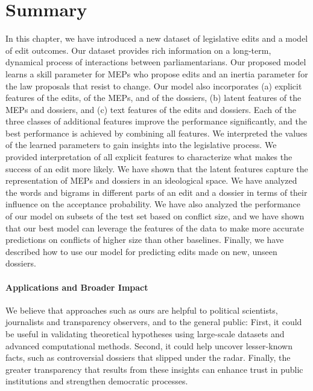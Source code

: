 \section{Summary}
\label{lmp:sec:conclusion}

In this chapter, we have introduced a new dataset of legislative edits and a model of edit outcomes.
Our dataset provides rich information on a long-term, dynamical process of interactions between parliamentarians.
Our proposed model learns a skill parameter for MEPs who propose edits and an inertia parameter for the law proposals that resist to change.
Our model also incorporates (a) explicit features of the edits, of the MEPs, and of the dossiers, (b) latent features of the MEPs and dossiers, and (c) text features of the edits and dossiers.
Each of the three classes of additional features improve the performance significantly, and the best performance is achieved by combining all features.
We interpreted the values of the learned parameters to gain insights into the legislative process.
We provided interpretation of all explicit features to characterize what makes the success of an edit more likely.
We have shown that the latent features capture the representation of MEPs and dossiers in an ideological space.
We have analyzed the words and bigrams in different parts of an edit and a dossier in terms of their influence on the acceptance probability.
We have also analyzed the performance of our model on subsets of the test set based on conflict size, and we have shown that our best model can leverage the features of the data to make more accurate predictions on conflicts of higher size than other baselines.
Finally, we have described how to use our model for predicting edits made on new, unseen dossiers.

\paragraph{Applications and Broader Impact}
We believe that approaches such as ours are helpful to political scientists, journalists and transparency observers, and to the general public:
First, it could be useful in validating theoretical hypotheses using large-scale datasets and advanced computational methods.
Second, it could help uncover lesser-known facts, such as controversial dossiers that slipped under the radar.
Finally, the greater transparency that results from these insights can enhance trust in public institutions and strengthen democratic processes.

